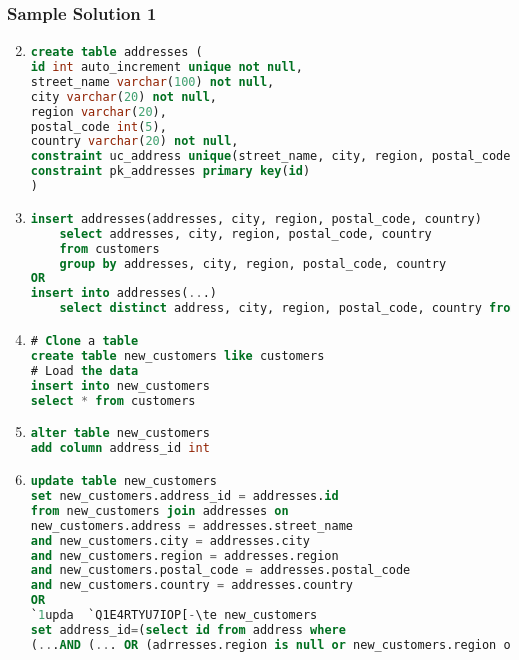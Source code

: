 \subsubsection*{Sample Solution 1}
\begin{enumerate}
\setcounter{enumi}{1}
\item 
\begin{lstlisting}[language=SQL]
create table addresses (
id int auto_increment unique not null,
street_name varchar(100) not null,
city varchar(20) not null,
region varchar(20),
postal_code int(5),
country varchar(20) not null,
constraint uc_address unique(street_name, city, region, postal_code, country),
constraint pk_addresses primary key(id)
)
\end{lstlisting}

\item
\begin{lstlisting}[language=SQL]
insert addresses(addresses, city, region, postal_code, country)
	select addresses, city, region, postal_code, country
    from customers
    group by addresses, city, region, postal_code, country
OR
insert into addresses(...)
    select distinct address, city, region, postal_code, country from customers
\end{lstlisting}

\item
\begin{lstlisting}[language=SQL]
# Clone a table
create table new_customers like customers
# Load the data
insert into new_customers 
select * from customers
\end{lstlisting}

\item
\begin{lstlisting}[language=SQL]
alter table new_customers
add column address_id int
\end{lstlisting}

\item
\begin{lstlisting}[language=SQL]
update table new_customers
set new_customers.address_id = addresses.id
from new_customers join addresses on
new_customers.address = addresses.street_name 
and new_customers.city = addresses.city 
and new_customers.region = addresses.region 
and new_customers.postal_code = addresses.postal_code 
and new_customers.country = addresses.country
OR
`1upda	`Q1E4RTYU7IOP[-\te new_customers
set address_id=(select id from address where
(...AND (... OR (adrresses.region is null or new_customers.region os null)))
\end{lstlisting}


\end{enumerate}
